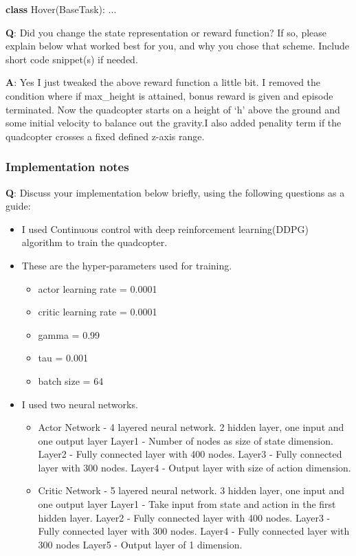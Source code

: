 \documentclass[11pt]{article}
\providecommand{\tightlist}{%
      \setlength{\itemsep}{0pt}\setlength{\parskip}{0pt}}
\newenvironment{Shaded}{}{}
\newcommand{\KeywordTok}[1]{\textcolor[rgb]{0.00,0.44,0.13}{\textbf{{#1}}}}
\newcommand{\NormalTok}[1]{{#1}}
\begin{document}
\begin{Shaded}
\begin{Highlighting}[]
\KeywordTok{class}\NormalTok{ Hover(BaseTask):}
\NormalTok{    ...}
\end{Highlighting}
\end{Shaded}

\textbf{Q}: Did you change the state representation or reward function?
If so, please explain below what worked best for you, and why you chose
that scheme. Include short code snippet(s) if needed.

\textbf{A}: Yes I just tweaked the above reward function a little bit. I
removed the condition where if max\_height is attained, bonus reward is
given and episode terminated. Now the quadcopter starts on a height of
`h' above the ground and some initial velocity to balance out the
gravity.I also added penality term if the quadcopter crosses a fixed
defined z-axis range.

\hypertarget{implementation-notes}{%
\subsubsection{Implementation notes}\label{implementation-notes}}

\textbf{Q}: Discuss your implementation below briefly, using the
following questions as a guide:

\begin{itemize}
\tightlist
\item
  I used Continuous control with deep reinforcement learning(DDPG)
  algorithm to train the quadcopter.
\item
  These are the hyper-parameters used for training.

  \begin{itemize}
  \tightlist
  \item
    actor learning rate = 0.0001
  \item
    critic learning rate = 0.0001
  \item
    gamma = 0.99
  \item
    tau = 0.001
  \item
    batch size = 64
  \end{itemize}
\item
  I used two neural networks.

  \begin{itemize}
  \item
    Actor Network - 4 layered neural network. 2 hidden layer, one input
    and one output layer Layer1 - Number of nodes as size of state
    dimension. Layer2 - Fully connected layer with 400 nodes. Layer3 -
    Fully connected layer with 300 nodes. Layer4 - Output layer with
    size of action dimension.
  \item
    Critic Network - 5 layered neural network. 3 hidden layer, one input
    and one output layer Layer1 - Take input from state and action in
    the first hidden layer. Layer2 - Fully connected layer with 400
    nodes. Layer3 - Fully connected layer with 300 nodes. Layer4 - Fully
    connected layer with 300 nodes Layer5 - Output layer of 1 dimension.
  \end{itemize}
\end{itemize}
\end{document}
